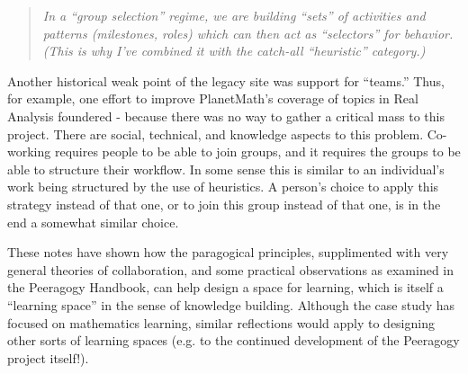 \begin{quote}
\emph{In a ``group selection'' regime, we are building ``sets'' of
activities and patterns (milestones, roles) which can then act as
``selectors'' for behavior. (This is why I've combined it with the
catch-all ``heuristic'' category.)}
\end{quote}
Another historical weak point of the legacy site was support for
``teams.'' Thus, for example, one effort to improve PlanetMath's
coverage of topics in Real Analysis foundered - because there was no way
to gather a critical mass to this project. There are social, technical,
and knowledge aspects to this problem. Co-working requires people to be
able to join groups, and it requires the groups to be able to structure
their workflow. In some sense this is similar to an individual's work
being structured by the use of heuristics. A person's choice to apply
this strategy instead of that one, or to join this group instead of that
one, is in the end a somewhat similar choice.

These notes have shown how the paragogical principles, supplimented with
very general theories of collaboration, and some practical observations
as examined in the Peeragogy Handbook, can help design a space for
learning, which is itself a ``learning space'' in the sense of knowledge
building. Although the case study has focused on mathematics learning,
similar reflections would apply to designing other sorts of learning
spaces (e.g. to the continued development of the Peeragogy project
itself!).
